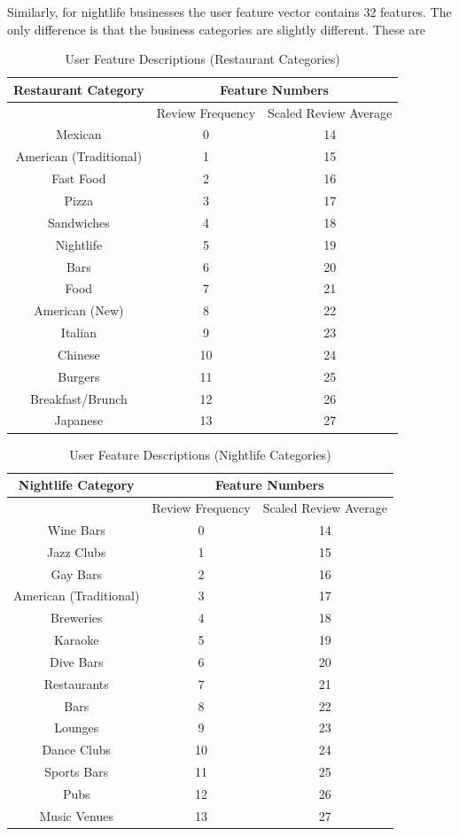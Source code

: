 \documentclass[11pt]{article}
\begin{document}
Similarly, for nightlife businesses the user feature vector contains 32 features. The only difference is that the business categories are slightly different. These are 

\begin{table}[h!]
	\caption{User Feature Descriptions (Restaurant Categories)}
	\centering
	\begin{tabular}{c|c|c}
		Restaurant Category & \multicolumn{2}{c}{Feature Numbers} \\ \hline
		& Review Frequency & Scaled Review Average \\
		Mexican & 0 & 14 \\
		American (Traditional) & 1 & 15\\
		Fast Food & 2 & 16\\
		Pizza & 3 & 17\\
		Sandwiches & 4 & 18\\
		Nightlife & 5 & 19\\
		Bars & 6 & 20\\
		Food & 7 & 21\\
		American (New) & 8 & 22\\
		Italian & 9 & 23\\
		Chinese & 10 & 24\\
		Burgers & 11 & 25\\
		Breakfast/Brunch & 12 & 26\\
		Japanese & 13 & 27\\
	\end{tabular}
	\label{tab:user_features1}
\end{table}

\begin{table}[h!]
	\caption{User Feature Descriptions (Nightlife Categories)}
	\centering
	\begin{tabular}{c|c|c}
		Nightlife Category & \multicolumn{2}{c}{Feature Numbers} \\ \hline
		& Review Frequency & Scaled Review Average \\
		Wine Bars & 0 & 14 \\
		Jazz Clubs & 1 & 15\\
		Gay Bars & 2 & 16\\
		American (Traditional) & 3 & 17\\
		Breweries & 4 & 18\\
		Karaoke & 5 & 19\\
		Dive Bars & 6 & 20\\
		Restaurants & 7 & 21\\
		Bars & 8 & 22\\
		Lounges & 9 & 23\\
		Dance Clubs & 10 & 24\\
		Sports Bars & 11 & 25\\
		Pubs & 12 & 26\\
		Music Venues & 13 & 27\\
	\end{tabular}
	\label{tab:user_features2}
\end{table}
\end{document}
